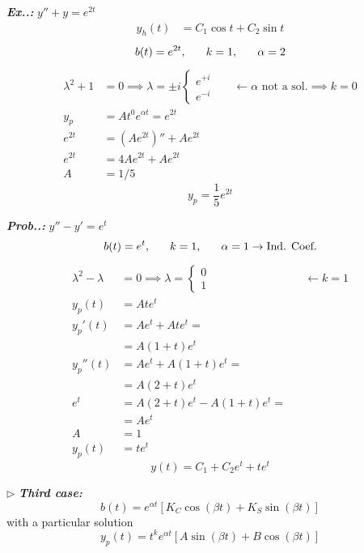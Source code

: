\documentclass[a4paper]{article}
\begin{document}
\setcounter{equation}{0}
\vspace{2ex}\textbf{\textit{Ex.\thesection.\theex: }}$y''+y=e^{ 2t }$
\begin{align}
y_{h}(t)&=C_{1}\cos t+C_{2}\sin t
\end{align}
$$
b(t)=e^{ 2t },\hspace{4ex}k=1,\hspace{4ex}\alpha=2
$$
\begin{align}
\lambda^{2}+1&=0\implies \lambda=\pm i\begin{cases}
e^{ +i } \\
e^{ -i }
\end{cases}  & &\leftarrow \alpha\text{ not a sol.}\implies k=0 \\
y_{p}&=At^0e^{ \alpha t }=e^{ 2t } \\
e^{ 2t }&=(Ae^{ 2t })''+Ae^{ 2t } \\
e^{ 2t }&=4Ae^{ 2t }+Ae^{ 2t } \\
A&=1 / 5
\end{align}
$$
\boxed{y_{p}=\frac{1}{5}e^{ 2t }}
$$

\vspace{2ex}\textbf{\textit{Prob.\thesection.\theprob: }}$y''-y'=e^{ t }$
$$
b(t)=e^{ t },\hspace{4ex}k=1,\hspace{4ex}\alpha=1 \to \text{Ind. Coef.}
$$
\begin{align}
\lambda^{2}-\lambda&=0\implies \lambda=\begin{cases}
0 \\
1
\end{cases} & &\leftarrow k=1 \\
y_{p}(t)&=Ate^{ t }  \\
y_{p}'(t)&= Ae^{ t }+Ate^{ t }= \\
&=A(1+t)e^{ t } \\
y_{p}'' (t)& =Ae^{ t}+A(1+t)e^{ t }= \\
 & =A(2+t)e^{ t } \\
e^{ t } & =A(2+t)e^{ t }-A(1+t)e^{ t }= \\
 & =Ae^{ t } \\
A & =1 \\
y_{p}(t) & =te^{ t }
\end{align}
$$
\boxed{y(t)=C_{1}+C_{2}e^{ t }+te^{ t }}
$$

$\triangleright$ \textbf{\textit{Third case:}} 
$$
b(t)=e^{ \alpha t }[K_{C}\cos(\beta t)+K_{S}\sin(\beta t)]
$$
with a particular solution
$$
y_{p}(t)=t^{k}e^{ \alpha t }[A\sin(\beta t)+B\cos(\beta t)]
$$
\end{document}
